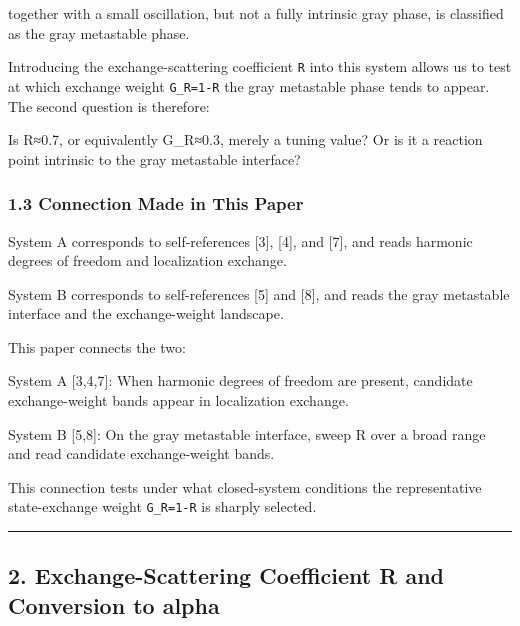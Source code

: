 \documentclass[
]{article}
\newenvironment{Shaded}{}{}
\newcommand{\NormalTok}[1]{#1}
\begin{document}
together with a small oscillation, but not a fully intrinsic gray phase,
is classified as the gray metastable phase.

Introducing the exchange-scattering coefficient \texttt{R} into this
system allows us to test at which exchange weight \texttt{G\_R=1-R} the
gray metastable phase tends to appear. The second question is therefore:

\begin{Shaded}
\begin{Highlighting}[]
\NormalTok{Is R≈0.7, or equivalently G\_R≈0.3, merely a tuning value?}
\NormalTok{Or is it a reaction point intrinsic to the gray metastable interface?}
\end{Highlighting}
\end{Shaded}

\subsubsection{1.3 Connection Made in This
Paper}\label{connection-made-in-this-paper}

System A corresponds to self-references {[}3{]}, {[}4{]}, and {[}7{]},
and reads harmonic degrees of freedom and localization exchange.

System B corresponds to self-references {[}5{]} and {[}8{]}, and reads
the gray metastable interface and the exchange-weight landscape.

This paper connects the two:

\begin{Shaded}
\begin{Highlighting}[]
\NormalTok{System A [3,4,7]:}
\NormalTok{  When harmonic degrees of freedom are present,}
\NormalTok{  candidate exchange{-}weight bands appear in localization exchange.}

\NormalTok{System B [5,8]:}
\NormalTok{  On the gray metastable interface,}
\NormalTok{  sweep R over a broad range and read candidate exchange{-}weight bands.}
\end{Highlighting}
\end{Shaded}

This connection tests under what closed-system conditions the
representative state-exchange weight \texttt{G\_R=1-R} is sharply
selected.

\begin{center}\rule{0.5\linewidth}{0.5pt}\end{center}

\subsection{2. Exchange-Scattering Coefficient R and Conversion to
alpha}\label{exchange-scattering-coefficient-r-and-conversion-to-alpha}
\end{document}

